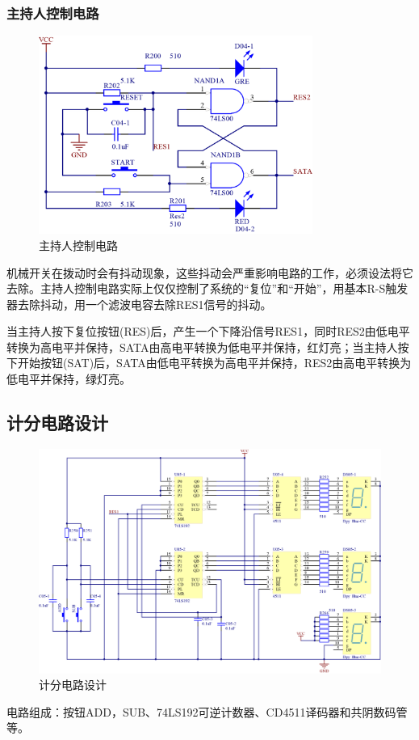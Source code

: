 \documentclass{../source/Experiment}
\begin{document}
            \subsubsection{主持人控制电路}
                \begin{figure}[H]
                    \centering
                    \includegraphics[width = 0.8\textwidth]{pic/P04.png}
                    \caption{主持人控制电路}
                \end{figure}
            机械开关在拨动时会有抖动现象，这些抖动会严重影响电路的工作，必须设法将它去除。主持人控制电路实际上仅仅控制了系统的“复位”和“开始”，用基本R-S触发器去除抖动，用一个滤波电容去除RES1信号的抖动。
            
            当主持人按下复位按钮(RES)后，产生一个下降沿信号RES1，同时RES2由低电平转换为高电平并保持，SATA由高电平转换为低电平并保持，红灯亮；当主持人按下开始按钮(SAT)后，SATA由低电平转换为高电平并保持，RES2由高电平转换为低电平并保持，绿灯亮。
        \subsection{计分电路设计}
            \begin{figure}[H]
                \centering
                \includegraphics[width = 1\textwidth]{pic/P05.png}
                \caption{计分电路设计}
            \end{figure}
        电路组成：按钮ADD，SUB、74LS192可逆计数器、CD4511译码器和共阴数码管等。
\end{document}
